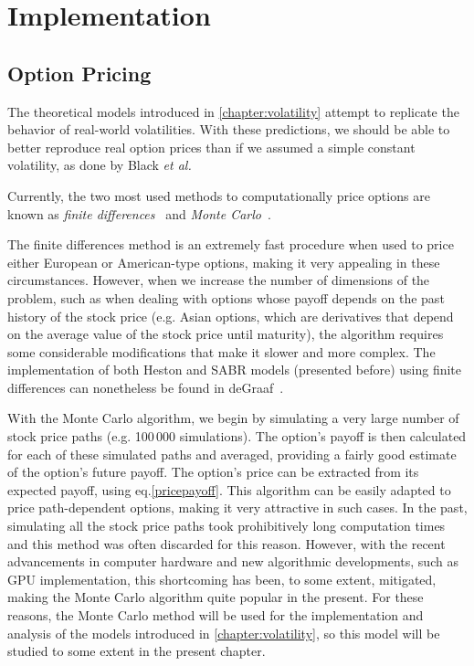 \chapter{Implementation}
\label{chapter:implementation}
\section{Option Pricing}
\label{section:Option Pricing}
The theoretical models introduced in \autoref{chapter:volatility} attempt to replicate the behavior of real-world volatilities. With these predictions, we should be able to better reproduce real option prices than if we assumed a simple constant volatility, as done by Black \textit{et al.}

Currently, the two most used methods to computationally price options are known as \emph{finite differences}~\citep{Hull} and \emph{Monte Carlo}~\citep{Glasserman}.

The finite differences method is an extremely fast procedure when used to price either European or American-type options, making it very appealing in these circumstances. However, when we increase the number of dimensions of the problem, such as when dealing with options whose payoff depends on the past history of the stock price (e.g. Asian options, which are derivatives that depend on the average value of the stock price until maturity), the algorithm requires some considerable modifications that make it slower and more complex.
The implementation of both Heston and SABR models (presented before) using finite differences can nonetheless be found in deGraaf~\citep{deGraaf}.


With the Monte Carlo algorithm, we begin by simulating a very large number of stock price paths (e.g. 100\,000 simulations). The option's payoff is then calculated for each of these simulated paths and averaged, providing a fairly good estimate of the option's future payoff. The option's price can be extracted from its expected payoff, using eq.\eqref{pricepayoff}. This algorithm can be easily adapted to price path-dependent options, making it very attractive in such cases.
In the past, simulating all the stock price paths took prohibitively long computation times and this method was often discarded for this reason. However, with the recent advancements in computer hardware and new algorithmic developments, such as GPU implementation, this shortcoming has been, to some extent, mitigated, making the Monte Carlo algorithm quite popular in the present.
For these reasons, the Monte Carlo method will be used for the implementation and analysis of the models introduced in \autoref{chapter:volatility}, so this model will be studied to some extent in the present chapter.


